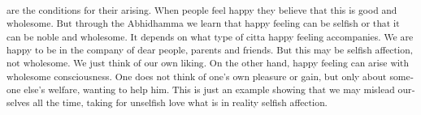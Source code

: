 \textsuperscript{\textdutch{are the conditions for their arising.
}\textenglish[variant=american]{When people feel happy they believe that
this is good and wholesome. But through the Abhidhamma we learn that
happy feeling can be selfish or that it can be noble and wholesome. It
depends on what type of citta happy feeling accompanies. We are happy to
be in the company of dear people, parents and friends. But this may be
selfish affection, not wholesome. We just think of our own liking. On
the other hand, happy feeling can arise with wholesome consciousness.
One does not think of one's own pleasure or gain, but
}\textdutch{only}\textenglish[variant=american]{ about someone else's
welfare, wanting to help him. This is just an example showing that we
may mislead ourselves all the time, taking for unselfish love what is in
reality selfish affection.}~}

